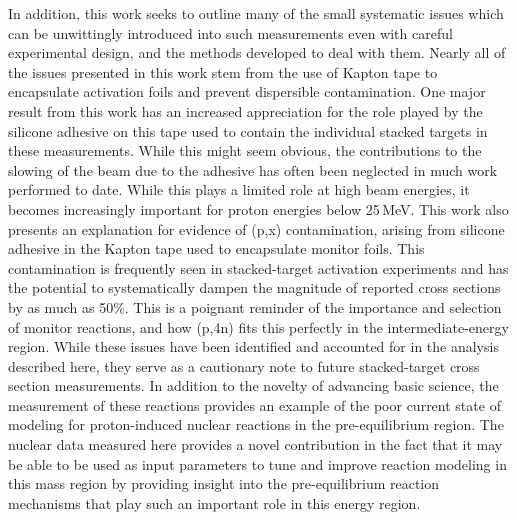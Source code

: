 In addition, this work seeks to outline many of the small systematic issues which can be unwittingly introduced into such measurements even with careful experimental design, and the methods developed to deal with them.
Nearly all of the issues presented in this work stem from the use of Kapton tape to encapsulate activation foils and prevent dispersible contamination.
One major result from this work has an increased appreciation for the role played by the silicone adhesive on this tape used to contain the individual stacked targets in these measurements. 
While this might seem obvious, the contributions to the slowing of the beam due to the adhesive has often been neglected in much work performed to date. 
While this plays a limited role at high beam energies, it becomes increasingly important for proton energies below 25\,MeV. 
This work also presents an explanation for evidence of (p,x) contamination, arising from silicone adhesive in the Kapton tape used to encapsulate monitor foils. 
This contamination is frequently seen in stacked-target activation experiments and has the potential to systematically dampen the magnitude of reported cross sections by as much as 50\%. 
This is a poignant reminder of the importance and selection of monitor reactions, and how (p,4n) fits this perfectly in the intermediate-energy region.
While these issues have been identified and accounted for in the analysis described here, they serve as a cautionary note to future stacked-target cross section measurements.
In addition to the novelty of advancing basic science, the measurement of these reactions provides an example of the poor current state of modeling for proton-induced nuclear reactions in the pre-equilibrium region.
The nuclear data measured here provides a novel contribution in the fact that it may be able to be used as input parameters to tune and improve reaction modeling in this mass region by providing insight into the pre-equilibrium reaction mechanisms that play such an important role in this energy region.





